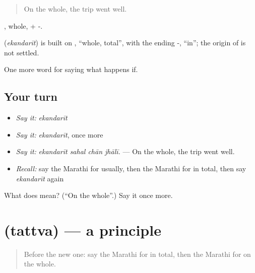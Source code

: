 \begin{quote}
On the whole, the trip went well.
\end{quote}

, whole, + -.

\begin{cousinweb}
\textbf{} (\emph{ekandarīt}) is built on , \textquotedblleft{}whole, total\textquotedblright{}, with the ending -, \textquotedblleft{}in\textquotedblright{}; the origin of  is not settled.
\end{cousinweb}

\begin{grammarlens}[title={What you've built}]
One more word for saying what happens if.
\end{grammarlens}

\subsection*{Your turn}
\begin{itemize}
\raggedright
  \item \emph{Say it:} \emph{ekandarīt}
  \item \emph{Say it:} \emph{ekandarīt}, once more
  \item \emph{Say it:} \emph{ekandarīt sahal chān jhālī.} — On the whole, the trip went well.
  \item \emph{Recall:} say the Marathi for usually, then the Marathi for in total, then say \emph{ekandarīt} again
\end{itemize}

\begin{tcolorbox}[breakable,colback=teal!4,colframe=teal!35!black,title={Before you move on}]
What does  mean? (\textquotedblleft{}On the whole\textquotedblright{}.) Say it once more.
\end{tcolorbox}
\section[\texorpdfstring{\mr{तत्त्व} (tattva)}{तत्त्व (tattva)}]{ (tattva) — a principle}

\label{lesson:MR-C390-tattva}



\begin{quote}
Before the new one: say the Marathi for in total, then the Marathi for on the whole.
\end{quote}

